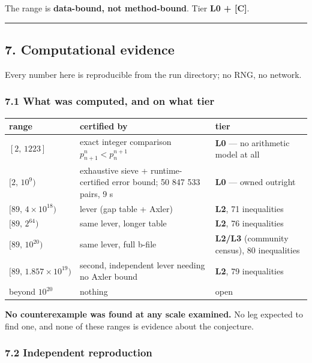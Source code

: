 \documentclass[
  a4paper,
  11pt]{article}
\begin{document}
The range is \textbf{data-bound, not method-bound}. Tier \textbf{L0 +
{[}C{]}}.

\begin{center}\rule{0.5\linewidth}{0.5pt}\end{center}

\subsection{7. Computational evidence}\label{7-computational-evidence}

Every number here is reproducible from the run directory; no RNG, no
network.

\subsubsection{7.1 What was computed, and on what
tier}\label{71-what-was-computed-and-on-what-tier}

\begin{longtable}[]{@{}lll@{}}
\toprule\noalign{}
range & certified by & tier \\
\midrule\noalign{}
\endhead
\bottomrule\noalign{}
\endlastfoot
\([2,\,1223]\) & exact integer comparison \(p_{n+1}^n < p_n^{n+1}\) &
\textbf{L0} --- no arithmetic model at all \\
\([2,\,10^9)\) & exhaustive sieve + runtime-certified error bound; 50
847 533 pairs, 9 s & \textbf{L0} --- owned outright \\
\([89,\,4\times10^{18})\) & lever (gap table + Axler) & \textbf{L2}, 71
inequalities \\
\([89,\,2^{64})\) & same lever, longer table & \textbf{L2}, 76
inequalities \\
\([89,\,10^{20})\) & same lever, full b-file & \textbf{L2/L3} (community
census), 80 inequalities \\
\([89,\,1.857\times10^{19})\) & second, independent lever needing no
Axler bound & \textbf{L2}, 79 inequalities \\
beyond \(10^{20}\) & nothing & open \\
\end{longtable}

\textbf{No counterexample was found at any scale examined.} No leg
expected to find one, and none of these ranges is evidence about the
conjecture.

\subsubsection{7.2 Independent
reproduction}\label{72-independent-reproduction}
\end{document}

